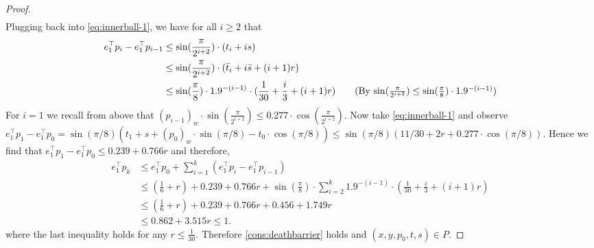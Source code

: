 \documentclass{article}\usepackage[a4paper,margin=20mm]{geometry}
\begin{document}
\begin{proof}
\begin{align*}
    \end{align*}
    Plugging back into \eqref{eq:innerball-1}, we have for all $i\geq 2$ that
    \begin{align*}
        e_1^\top p_i - e_1^\top p_{i-1} &\leq \sin(\frac{\pi}{2^{i + 2}}) \cdot (t_i + is) \\
        &\leq \sin(\frac{\pi}{2^{i + 2}}) \cdot (\bar{t}_i + i\bar{s} + (i+1)r) \\
        &\leq \sin(\frac{\pi}{8}) \cdot 1.9^{-(i-1)} \cdot (\frac{1}{30} + \frac{i}{3} + (i+1)r) \tag{By $\sin(\frac{\pi}{2^{i + 2}}) \leq \sin(\frac{\pi}{8}) \cdot 1.9^{-(i-1)}$}
    \end{align*}
    For $i=1$ we recall from above that $(p_{i-1})_w \cdot \sin(\frac{\pi}{2^{i + 2}}) \leq 0.277 \cdot \cos(\frac{\pi}{2^{i+2}})$.
    Now take \eqref{eq:innerball-1} and observe
    $e_1^\top p_1 - e_1^\top p_0 = \sin(\pi/8)(t_1 + s + (p_0)_w \cdot\sin(\pi/8) - t_0\cdot\cos(\pi/8))
    \leq \sin(\pi/8)(11/30 + 2r + 0.277 \cdot \cos(\pi/8))$.
    Hence we find that $e_1^\top p_1 - e_1^\top p_0 \leq 0.239 + 0.766r$    
    and therefore,
    \begin{align*}
        e_1^\top p_k &\leq e_1^\top p_0 + \sum_{i=1}^k (e_1^\top p_i - e_1^\top p_{i-1}) \\
        &\leq (\frac{1}{6} + r) + 0.239 + 0.766r + \sin(\frac{\pi}{8}) \cdot \sum_{i=2}^k 1.9^{-(i-1)} \cdot (\frac{1}{30} + \frac{i}{3} + (i+1)r) \\
        &\leq (\frac{1}{6} + r) + 0.239 + 0.766r + 0.456 + 1.749r \\
        &\leq 0.862 + 3.515 r \leq 1.
    \end{align*}
    where the last inequality holds for any $r \leq \frac{1}{30}$.
    Therefore \eqref{cons:deathbarrier} holds and $(x, y, p_0, t, s) \in P$.
\end{proof}
\end{document}
